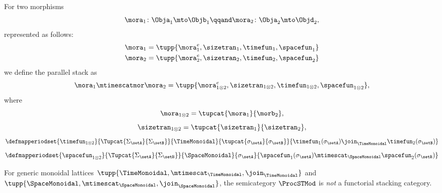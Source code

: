 \begin{lemma}
	For two morphisms
	\begin{equation}
		\mora_1 \colon \Obja_1 \mto \Objb_1
		\qqand
		\mora_2 \colon \Obja_2 \mto \Objd_2,
	\end{equation}
	represented as follows:
	\begin{align}
		\mora_1 & = \tupp{\mora^e_1, \sizetran_1,  \timefun_1,
		\spacefun_{1}  }                                                       \\
		\mora_2 & = \tupp{\mora^e_2, \sizetran_2,  \timefun_2, \spacefun_{2} }
	\end{align}
	we define the parallel stack as
	\begin{equation}
		\mora_1 \mtimescatmor \mora_2 = \tupp{
		\mora^e_{1\otimes2},
		\sizetran_{1\otimes2},
		\timefun_{1\otimes2},
		\spacefun_{1\otimes2}
		},
	\end{equation}
	where
	\begin{equation}
		\mora_{1\otimes2} = \tupcat {\mora_1}  {\morb_2},
	\end{equation}
	\begin{equation}
		\sizetran_{1\otimes2} =  \tupcat {\sizetran_1}  {\sizetran_2},
	\end{equation}
	\begin{equation}
		\defmapperiodset{
			\timefun_{1\otimes 2}
		}{
			\Tupcat {\Sigma_{\setA}} {\Sigma_{\setB}}
		}{
			\TimeMonoidal
		}{
			\tupcat {\sigma_{\setA}} {\sigma_{\setB}}
		}{
			\timefun_1(\sigma_{\setA}) \join_{\TimeMonoidal} \timefun_2(\sigma_{\setB})
		}
	\end{equation}
	\begin{equation}
		\defmapperiodset{
			\spacefun_{1\otimes2}
		}{
			\Tupcat {\Sigma_{\setA}} {\Sigma_{\setB}}
		}{
			\SpaceMonoidal
		}{
			\sigma_{\setA}
		}{
			\spacefun_1(\sigma_{\setA}) \mtimescat_{\SpaceMonoidal} \spacefun_2(\sigma_{\setB})
		}
	\end{equation}
\end{lemma}

\begin{lemma}
	For generic monoidal lattices $\tupp{\TimeMonoidal, \mtimescat_{\TimeMonoidal}, \join_{\TimeMonoidal}}$ and $\tupp{\SpaceMonoidal, \mtimescat_{\SpaceMonoidal}, \join_{\SpaceMonoidal}}$, the semicategory $\ProcSTMod$  is \emph{not} a functorial stacking category.
\end{lemma}

